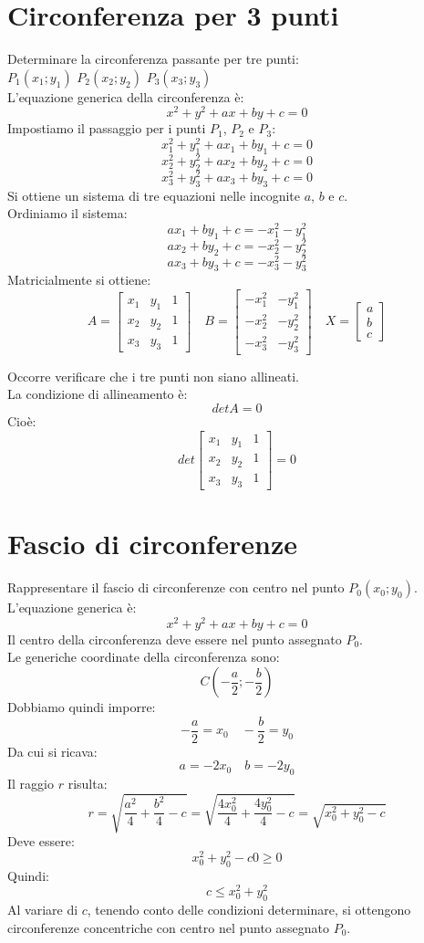 \documentclass[12pt]{book}
\begin{document}
		
			\section{Circonferenza per 3 punti}
			Determinare la circonferenza passante per tre punti:\\ $P_1(x_1;y_1)$ $P_2(x_2;y_2)$ $P_3(x_3;y_3)$\\
			L'equazione generica della circonferenza è:
			\[x^2+y^2+ax+by+c=0\]
			Impostiamo il passaggio per i punti $P_1$, $P_2$ e $P_3$:
			\[x^2_1+y^2_1+ax_1+by_1+c=0\]
			\[x^2_2+y^2_2+ax_2+by_2+c=0\]
			\[x^2_3+y^2_3+ax_3+by_3+c=0\]
			Si ottiene un sistema di tre equazioni nelle incognite $a$, $b$ e $c$.\\ Ordiniamo il sistema:
			\[ax_1+by_1+c=-x^2_1-y^2_1\]
			\[ax_2+by_2+c=-x^2_2-y^2_2\]
			\[ax_3+by_3+c=-x^2_3-y^2_3\]
			Matricialmente si ottiene:
			\[A=\begin{bmatrix}
				x_1 & y_1 & 1 \\
				x_2 & y_2 & 1 \\
				x_3 & y_3 & 1 
			\end{bmatrix}
			\quad
			B=\begin{bmatrix}
				-x_1^2	& -y_1^2 \\
				-x_2^2  & -y_2^2 \\
				-x_3^2  & -y_3^2
			\end{bmatrix}
			\quad
			X=\begin{bmatrix}
				a\\
				b\\
				c
			\end{bmatrix}\]
		
			Occorre verificare che i tre punti non siano allineati.\\
			La condizione di allineamento è:
			\[detA=0\]
			Cioè:
			\[det\begin{bmatrix}
				x_1 & y_1 & 1\\
				x_2 & y_2 & 1\\
				x_3 & y_3 & 1
			\end{bmatrix}=0\]
		\section{Fascio di circonferenze}
			Rappresentare il fascio di circonferenze con centro nel punto $P_0(x_0;y_0)$.\\
			L'equazione generica è:
			\[x^2+y^2+ax+by+c=0\]
			Il centro della circonferenza deve essere nel punto assegnato $P_0$.\\ Le generiche coordinate della
			circonferenza sono:
			\[C\left(-\frac{a}{2};-\frac{b}{2}\right)\]
			Dobbiamo quindi imporre:
			\[-\frac{a}{2}=x_0\quad -\frac{b}{2}=y_0\]
			Da cui si ricava:
			\[a=-2x_0\quad b=-2y_0\]
			Il raggio $r$ risulta:
			\[r=\sqrt{\frac{a^2}{4}+\frac{b^2}{4}-c}
			=\sqrt{\frac{4x_0^2}{4}+\frac{4y_0^2}{4}-c}
			=\sqrt{x_0^2+y_0^2-c}\] 
			Deve essere:
			\[x_0^2+y_0^2-c0\ge0\]
			Quindi:
			\[c\le x_0^2+y_0^2\]
			Al variare di $c$, tenendo conto delle condizioni determinare, si ottengono circonferenze concentriche con centro nel punto assegnato $P_0$.
\end{document}
